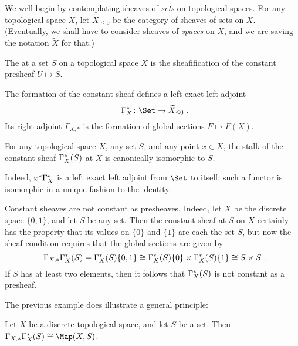 \begin{ntn}
	We well begin by contemplating sheaves of \emph{sets} on topological spaces.
	For any topological space $ X $, let $ \widetilde{X}_{\leq 0} $ be the category of sheaves of sets on $ X $.
	(Eventually, we shall have to consider sheaves of \emph{spaces} on $ X $, and we are saving the notation $ \widetilde{X} $ for that.)
\end{ntn}

\begin{dfn}
	The  at a set $ S $ on a topological space $ X $ is the sheafification of the constant presheaf $ U \mapsto S $.
\end{dfn}

\begin{nul}
	The formation of the constant sheaf defines a left exact left adjoint
	\[
		\Gammaupperstar_X \colon \Set \to \widetilde{X}_{\leq 0} \period
	\]
	Its right adjoint $ \Gamma_{X, \ast} $ is the formation of global sections $ F \mapsto F(X) $.
\end{nul}

\begin{nul}
	For any topological space $ X $, any set $ S $, and any point $ x \in X $, the stalk of the constant sheaf $ \Gamma^{\ast}_X (S) $ at $ X $ is canonically isomorphic to $ S $.

	Indeed, $ x^{\ast} \Gamma^{\ast}_X $ is a left exact left adjoint from $ \Set $ to itself;
	such a functor is isomorphic in a unique fashion to the identity.
\end{nul}

\begin{exm}
	Constant sheaves are not constant as presheaves.
	Indeed, let $ X $ be the discrete space $ \{ 0, 1 \} $, and let $ S $ be any set.
	Then the constant sheaf at $ S $ on $ X $ certainly has the property that its values on $ \{ 0 \} $ and $ \{ 1 \} $ are each the set $ S $, but now the sheaf condition requires that the global sections are given by
	\[
		\Gamma_{X, \ast} \Gammaupperstar_X (S) = \Gammaupperstar_X (S) \{0,1\} \cong \Gammaupperstar_X (S) \{ 0 \} \times \Gammaupperstar_X (S) \{ 1 \} \cong S \times S \period
	\]
	If $ S $ has at least two elements, then it follows that $ \Gamma^{\ast}_X (S) $ is not constant as a presheaf.
\end{exm}

The previous example does illustrate a general principle:

\begin{lem}
	Let $ X $ be a discrete topological space, and let $ S $ be a set.
	Then $ \Gamma_{X, \ast} \Gammaupperstar_X ( S ) \cong \Map(X, S ) $. 
\end{lem}

